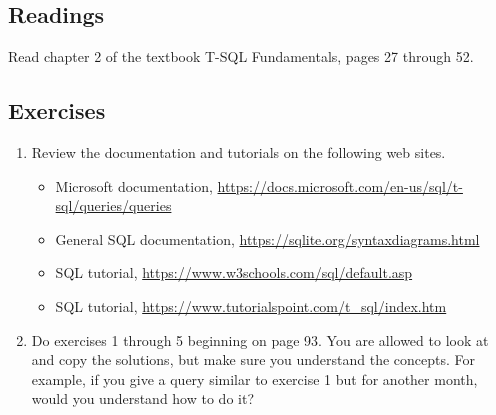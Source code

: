\documentclass{article}
\begin{document}
        \subsection{Readings}

         Read chapter 2 of the textbook T-SQL Fundamentals, pages 27 through 52.

        \subsection{Exercises}

    \begin{enumerate}

        \item Review the documentation and tutorials on the following web sites.
            \begin{itemize}
                \item Microsoft documentation, \url{https://docs.microsoft.com/en-us/sql/t-sql/queries/queries}
                \item General SQL documentation, \url{https://sqlite.org/syntaxdiagrams.html}
                \item SQL tutorial, \url{https://www.w3schools.com/sql/default.asp}
                \item SQL tutorial, \url{https://www.tutorialspoint.com/t_sql/index.htm}
            \end{itemize}


        \item Do exercises 1 through 5 beginning on page 93. You are allowed to look at and copy the solutions, but make sure you understand the concepts. For example, if you give a query similar to exercise 1 but for another month, would you understand how to do it?

    \end{enumerate}



        
\end{document}
